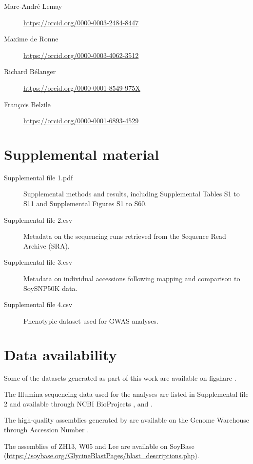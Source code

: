 \documentclass{article}
\begin{document}
\begin{description}
	\item[Marc-André Lemay] \url{https://orcid.org/0000-0003-2484-8447}
	\item[Maxime de Ronne] \url{https://orcid.org/0000-0003-4062-3512}
	\item[Richard Bélanger] \url{https://orcid.org/0000-0001-8549-975X}
	\item[François Belzile] \url{https://orcid.org/0000-0001-6893-4529}
\end{description}

\section*{Supplemental material}

\begin{description}
	\item[Supplemental file 1.pdf] Supplemental methods and results, including
		Supplemental Tables S1 to S11 and Supplemental Figures S1 to
		S60.

	\item[Supplemental file 2.csv] Metadata on the sequencing runs retrieved
		from the Sequence Read Archive (SRA).

	\item[Supplemental file 3.csv] Metadata on individual accessions following
		mapping and comparison to SoySNP50K data.

	\item[Supplemental file 4.csv] Phenotypic dataset used for GWAS analyses.
\end{description}

\section*{Data availability}

Some of the datasets generated as part of this work are available on figshare
.

The Illumina sequencing data used for the analyses are listed in Supplemental file 2
and available through NCBI BioProjects \citeauthor{PRJNA257011}, \citeauthor{PRJNA289660}
and \citeauthor{PRJNA639876}.

The high-quality assemblies generated by  are available
on the Genome Warehouse through Accession Number \citeauthor{PRJCA002030}.

The assemblies of ZH13, W05 and Lee are available on SoyBase
(\url{https://soybase.org/GlycineBlastPages/blast_descriptions.php}).
\end{document}
